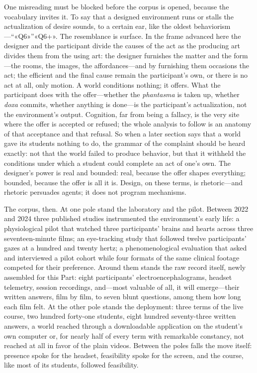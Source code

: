 One misreading must be blocked before the corpus is opened, because the vocabulary invites it. To say that a designed environment runs or stalls the actualization of desire sounds, to a certain ear, like the oldest behaviorism---``«Q6»''«Q6+». The resemblance is surface. In the frame advanced here the designer and the participant divide the causes of the act as the producing art divides them from the using art: the designer furnishes the matter and the form---the rooms, the images, the affordances---and by furnishing them occasions the act; the efficient and the final cause remain the participant's own, or there is no act at all, only motion. A world conditions nothing; it offers. What the participant does with the offer---whether the \textit{phantasma} is taken up, whether \textit{doxa} commits, whether anything is done---is the participant's actualization, not the environment's output. Cognition, far from being a fallacy, is the very site where the offer is accepted or refused; the whole analysis to follow is an anatomy of that acceptance and that refusal. So when a later section says that a world gave its students nothing to do, the grammar of the complaint should be heard exactly: not that the world failed to produce behavior, but that it withheld the conditions under which a student could complete an act of one's own. The designer's power is real and bounded: real, because the offer shapes everything; bounded, because the offer is all it is. Design, on these terms, is rhetoric---and rhetoric persuades agents; it does not program mechanisms.

The corpus, then. At one pole stand the laboratory and the pilot. Between 2022 and 2024 three published studies instrumented the environment's early life: a physiological pilot that watched three participants' brains and hearts across three seventeen-minute films; an eye-tracking study that followed twelve participants' gazes at a hundred and twenty hertz; a phenomenological evaluation that asked and interviewed a pilot cohort while four formats of the same clinical footage competed for their preference. Around them stands the raw record itself, newly assembled for this Part: eight participants' electroencephalograms, headset telemetry, session recordings, and---most valuable of all, it will emerge---their written answers, film by film, to seven blunt questions, among them how long each film felt. At the other pole stands the deployment: three terms of the live course, two hundred forty-one students, eight hundred seventy-three written answers, a world reached through a downloadable application on the student's own computer or, for nearly half of every term with remarkable constancy, not reached at all in favor of the plain videos. Between the poles falls the move itself: presence spoke for the headset, feasibility spoke for the screen, and the course, like most of its students, followed feasibility.

